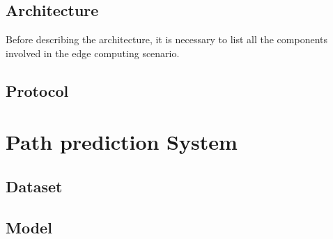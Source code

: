 \subsection{Architecture}
Before describing the architecture, it is necessary to list all the components involved in the edge computing scenario.
\subsection{Protocol}

\section{Path prediction System}
\subsection{Dataset}
\subsection{Model}